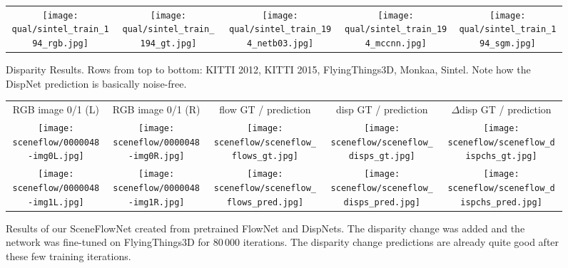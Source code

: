 \documentclass[10pt,twocolumn,letterpaper]{article}
\begin{document}
\begin{figure*}[t]
\begin{center}
{\begin{tabular}{ccccc}
      \texttt{[image: qual/sintel\_train\_194\_rgb.jpg]} &
      
      \texttt{[image: qual/sintel\_train\_194\_gt.jpg]} &
      \texttt{[image: qual/sintel\_train\_194\_netb03.jpg]} &
      \texttt{[image: qual/sintel\_train\_194\_mccnn.jpg]} &
      \texttt{[image: qual/sintel\_train\_194\_sgm.jpg]} \\
    \end{tabular}
  }
  \end{center}
  \caption{Disparity Results. Rows from top to bottom: KITTI 2012, KITTI 2015, FlyingThings3D, Monkaa, Sintel. Note how the DispNet prediction is basically noise-free.}
  \label{fig:gallery_disp}
\end{figure*}

\begin{figure*}[t]
  \begin{center}{
    \setlength{\tabcolsep}{1pt}%
    \begin{tabular}{ccccc}
      RGB image 0/1 (L) & 
      RGB image 0/1 (R) & 
      flow GT / prediction & 
      disp GT / prediction & 
      $\Delta$disp GT / prediction \\
      
      \texttt{[image: sceneflow/0000048-img0L.jpg]} &
      \texttt{[image: sceneflow/0000048-img0R.jpg]} &
      \texttt{[image: sceneflow/sceneflow\_flows\_gt.jpg]} &
      \texttt{[image: sceneflow/sceneflow\_disps\_gt.jpg]} &
      \texttt{[image: sceneflow/sceneflow\_dispchs\_gt.jpg]} \\
      
      \texttt{[image: sceneflow/0000048-img1L.jpg]} &
      \texttt{[image: sceneflow/0000048-img1R.jpg]} &
      \texttt{[image: sceneflow/sceneflow\_flows\_pred.jpg]} &
      \texttt{[image: sceneflow/sceneflow\_disps\_pred.jpg]} &
      \texttt{[image: sceneflow/sceneflow\_dispchs\_pred.jpg]} \\
    \end{tabular}
  }
  \end{center}
  \caption{Results of our SceneFlowNet created from pretrained FlowNet and DispNets. The disparity change was added and the network was fine-tuned on FlyingThings3D for $80\,000$ iterations. The disparity change predictions are already quite good after these few training iterations.}
  \label{fig:gallery_sceneflow}
\end{figure*}
\end{document}
